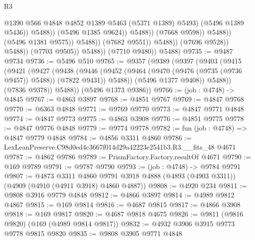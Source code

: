 \begin{lexlean}{R3}
\begin{coremodule}
                                                    @1390
                                                    @566
                                                    @4848
                                                    @4852
                                                    @1389
                                                    @5463
                                                    (@5371 @1389)
                                                    @5493)
                                                  (@5496 @1389 @5436))
                                                @5488))
                                            (@5496 @1385 @9624))
                                          @5488))
                                      (@7668 @9598))
                                    @5488))
                                (@5496 @1381 @9575))
                              @5488))
                          (@7682 @9551))
                        @5488))
                    (@7696 @9528))
                  @5488))
              (@7703 @9505))
            @5488))
        (@7710 @9480))
      @5488)
@9735 := @9487 @9734
@9736 := @5496 @510
@9765 := @9357
    (@9389
      (@9397
        (@9403
          (@9415
            (@9421
              (@9427
                (@9438
                  (@9446
                    (@9452 (@9464 (@9470 (@9476 (@9735 (@9736 @9457)) @5488)) (@7822 @9431)) @5488))
                  (@5496 @1377 @9408))
                @5488))
            (@7836 @9378))
          @5488))
      (@5496 @1373 @9386))
@9766 := (job : @4748) -> @4845
@9767 := @4863 @3897
@9768 := @4851 @9767
@9769 := @4847 @9768
@9770 := @6363 @4848
@9771 := @9769 @9770
@9773 := @4847 @9771 @4848
@9774 := @4847 @9773
@9775 := @4863 @3908
@9776 := @4851 @9775
@9778 := @4847 @9776 @4848
@9779 := @9774 @9778
@9782 := fun (job : @4748) => @4847 @9779 @4848
@9784 := @4856 @3311 @4860
@9786 := LexLeanPreserve.C98d0ed4c3667f014d29a42223e2541b3.R3.__fits_48 @4671
@9787 := @4862 @9786
@9789 := PrismFactory.Factory.resultOf @4671
@9790 := @169 @9789
@9791 := @9787 @9790
@9793 := (job : @4748) -> @9784 @9791
@9807 := @4873
    @3311
    @4860
    @9791
    @3918
    @4888
    (@4893 (@4903 @3311))
    (@4909 (@4910 (@4911 @3918) @4860 @4887))
@9808 := @4920 @234
@9811 := @9808 @3916 @9779 @4848
@9812 := @4866 @3897
@9814 := @4989 @9812 @4867
@9815 := @169 @9814
@9816 := @4687 @9815
@9817 := @4866 @3908
@9818 := @169 @9817
@9820 := @4687 @9818 @4675
@9826 := @9811 (@9816 @9820) (@169 (@4989 @9814 @9817))
@9832 := @4932 @3906 @3915 @9773 @9778 @9815 @9820
@9835 := @9808 @3905 @9771 @4848

\end{coremodule}
\end{lexlean}
